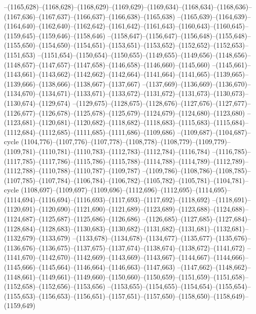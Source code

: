 --(1165,628)--(1168,628)--(1168,629)--(1169,629)--(1169,634)--(1168,634)--(1168,636)--(1167,636)--(1167,637)--(1166,637)--(1166,638)--(1165,638)
--(1165,639)--(1164,639)--(1164,640)--(1162,640)--(1162,642)--(1161,642)--(1161,643)--(1160,643)--(1160,645)--(1159,645)--(1159,646)--(1158,646)
--(1158,647)--(1156,647)--(1156,648)--(1155,648)--(1155,650)--(1154,650)--(1154,651)--(1153,651)--(1153,652)--(1152,652)--(1152,653)--(1151,653)
--(1151,654)--(1150,654)--(1150,655)--(1149,655)--(1149,656)--(1148,656)--(1148,657)--(1147,657)--(1147,658)--(1146,658)--(1146,660)--(1145,660)
--(1145,661)--(1143,661)--(1143,662)--(1142,662)--(1142,664)--(1141,664)--(1141,665)--(1139,665)--(1139,666)--(1138,666)--(1138,667)--(1137,667)
--(1137,669)--(1136,669)--(1136,670)--(1134,670)--(1134,671)--(1133,671)--(1133,672)--(1131,672)--(1131,673)--(1130,673)--(1130,674)--(1129,674)
--(1129,675)--(1128,675)--(1128,676)--(1127,676)--(1127,677)--(1126,677)--(1126,678)--(1125,678)--(1125,679)--(1124,679)--(1124,680)--(1123,680)
--(1123,681)--(1120,681)--(1120,682)--(1118,682)--(1118,683)--(1115,683)--(1115,684)--(1112,684)--(1112,685)--(1111,685)--(1111,686)--(1109,686)
--(1109,687)--(1104,687)--cycle
(1104,776)--(1107,776)--(1107,778)--(1108,778)--(1108,779)--(1109,779)--(1109,781)--(1110,781)--(1110,783)--(1112,783)--(1112,784)--(1116,784)
--(1116,785)--(1117,785)--(1117,786)--(1115,786)--(1115,788)--(1114,788)--(1114,789)--(1112,789)--(1112,788)--(1110,788)--(1110,787)--(1109,787)
--(1109,786)--(1108,786)--(1108,785)--(1107,785)--(1107,784)--(1106,784)--(1106,782)--(1105,782)--(1105,781)--(1104,781)--cycle
(1108,697)--(1109,697)--(1109,696)--(1112,696)--(1112,695)--(1114,695)--(1114,694)--(1116,694)--(1116,693)--(1117,693)--(1117,692)--(1118,692)
--(1118,691)--(1120,691)--(1120,690)--(1121,690)--(1121,689)--(1123,689)--(1123,688)--(1124,688)--(1124,687)--(1125,687)--(1125,686)--(1126,686)
--(1126,685)--(1127,685)--(1127,684)--(1128,684)--(1128,683)--(1130,683)--(1130,682)--(1131,682)--(1131,681)--(1132,681)--(1132,679)--(1133,679)
--(1133,678)--(1134,678)--(1134,677)--(1135,677)--(1135,676)--(1136,676)--(1136,675)--(1137,675)--(1137,674)--(1138,674)--(1138,672)--(1141,672)
--(1141,670)--(1142,670)--(1142,669)--(1143,669)--(1143,667)--(1144,667)--(1144,666)--(1145,666)--(1145,664)--(1146,664)--(1146,663)--(1147,663)
--(1147,662)--(1148,662)--(1148,661)--(1149,661)--(1149,660)--(1150,660)--(1150,659)--(1151,659)--(1151,658)--(1152,658)--(1152,656)--(1153,656)
--(1153,655)--(1154,655)--(1154,654)--(1155,654)--(1155,653)--(1156,653)--(1156,651)--(1157,651)--(1157,650)--(1158,650)--(1158,649)--(1159,649)
